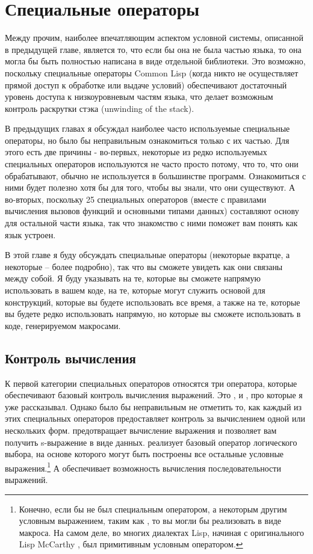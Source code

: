 \chapter{Специальные операторы}
\label{ch:20}

Между прочим, наиболее впечатляющим аспектом условной системы, описанной в предыдущей
главе, является то, что если бы она не была частью языка, то она могла бы быть полностью
написана в виде отдельной библиотеки.  Это возможно, поскольку специальные операторы
Common Lisp (когда никто не осуществляет прямой доступ к обработке или выдаче условий)
обеспечивают достаточный уровень доступа к низкоуровневым частям языка, что делает
возможным контроль раскрутки стэка (unwinding of the stack).

В предыдущих главах я обсуждал наиболее часто используемые специальные операторы, но было
бы неправильным ознакомиться только с их частью.  Для этого есть две причины - во-первых,
некоторые из редко используемых специальных операторов используются не часто просто
потому, что то, что они обрабатывают, обычно не используется в большинстве программ.
Ознакомиться с ними будет полезно хотя бы для того, чтобы вы знали, что они существуют.  А
во-вторых, поскольку 25 специальных операторов (вместе с правилами вычисления вызовов
функций и основными типами данных) составляют основу для остальной части языка, так что
знакомство с ними поможет вам понять как язык устроен.

В этой главе я буду обсуждать специальные операторы (некоторые вкратце, а некоторые --
более подробно), так что вы сможете увидеть как они связаны между собой.  Я буду указывать
на те, которые вы сможете напрямую использовать в вашем коде, на те, которые могут служить
основой для конструкций, которые вы будете использовать все время, а также на те, которые
вы будете редко использовать напрямую, но которые вы сможете использовать в коде,
генерируемом макросами.

\section{Контроль вычисления}

К первой категории специальных операторов относятся три оператора, которые обеспечивают
базовый контроль вычисления выражений. Это ,  и , про
которые я уже рассказывал.  Однако было бы неправильным не отметить то, как каждый из этих
специальных операторов предоставляет контроль за вычислением одной или нескольких форм.
 предотвращает вычисление выражения и позволяет вам получить s-выражение в
виде данных.  реализует базовый оператор логического выбора, на основе которого
могут быть построены все остальные условные выражения.\footnote{Конечно, если бы 
  не был специальным оператором, а некоторым другим условным выражением, таким как
  , то вы могли бы реализовать  в виде макроса.  На самом деле, во
  многих диалектах Lisp, начиная с оригинального Lisp McCarthy ,  был
  примитивным условным оператором.}  А  обеспечивает возможность вычисления
последовательности выражений.

